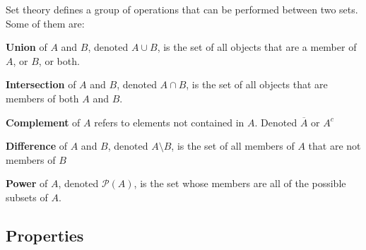 Set theory defines a group of operations that can be performed between two sets.
Some of them are:
\begin{description}
    \item \textbf{Union} of $A$ and $B$, denoted $A \cup B$, is the set of all
    objects that are a member of $A$, or $B$, or both.
    \item \textbf{Intersection} of $A$ and $B$, denoted $A \cap B$, is the set
    of all objects that are members of both $A$ and $B$.
    \item \textbf{Complement} of $A$ refers to elements not contained in $A$.
    Denoted $\overline{A}$ or $A^c$
    \item \textbf{Difference} of $A$ and $B$, denoted $A \setminus B$, is the
    set of all members of $A$ that are not members of $B$
    \item \textbf{Power} of $A$, denoted $\mathcal{P}(A)$, is the set whose
    members are all of the possible subsets of $A$. 
\end{description}

\subsection{Properties} %
\label{sub:properties}

